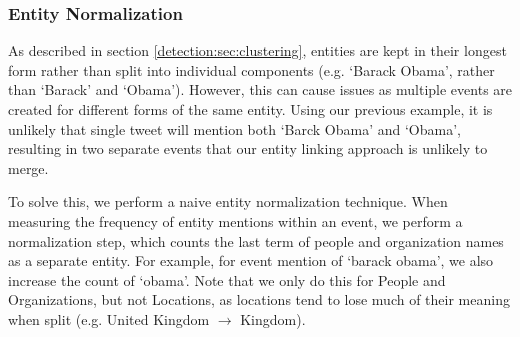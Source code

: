\subsubsection{Entity Normalization}
\label{sec:entityNorm}
As described in section \ref{detection:sec:clustering}, entities are kept in their longest form rather than split into individual components (e.g. `Barack Obama', rather than `Barack' and `Obama').
However, this can cause issues as multiple events are created for different forms of the same entity.
Using our previous example, it is unlikely that single tweet will mention both `Barck Obama' and `Obama', resulting in two separate events that our entity linking approach is unlikely to merge.

To solve this, we perform a naive entity normalization technique.
When measuring the frequency of entity mentions within an event, we perform a normalization step, which counts the last term of people and organization names as a separate entity.
For example, for event mention of `barack obama', we also increase the count of `obama'.
Note that we only do this for People and Organizations, but not Locations, as locations tend to lose much of their meaning when split (e.g. United Kingdom $\rightarrow$ Kingdom).